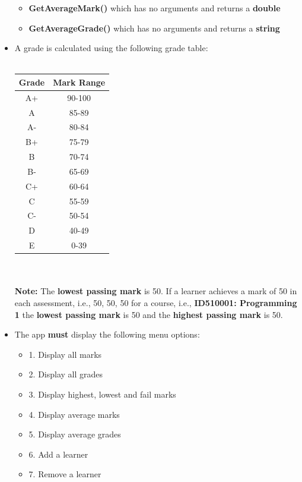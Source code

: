 \documentclass{article}
\begin{document}
\begin{itemize}
\begin{itemize}
        \item \textbf{GetAverageMark()} which has no arguments and returns a \textbf{double}
        \item \textbf{GetAverageGrade()} which has no arguments and returns a \textbf{string}
    \end{itemize}
    \item A grade is calculated using the following grade table:\\\\
    \renewcommand{\arraystretch}{1.5}
    \begin{tabular}{|c|c|}
        \hline
        \textbf{Grade} & \textbf{Mark Range} \\ \hline
        A+ & 90-100  \\ \hline
        A & 85-89  \\ \hline
        A- & 80-84 \\ \hline
        B+ & 75-79   \\ \hline
        B & 70-74  \\ \hline
        B- & 65-69  \\ \hline
        C+ & 60-64  \\ \hline
        C & 55-59 \\ \hline
        C- & 50-54  \\ \hline
        D & 40-49   \\ \hline
        E & 0-39   \\ \hline
    \end{tabular}
    \\\\ \textbf{Note:} The \textbf{lowest passing mark} is 50. If a learner achieves a mark of 50 in each assessment, i.e., 50, 50, 50 for a course, i.e., \textbf{ID510001: Programming 1} the \textbf{lowest passing mark} is 50 and the \textbf{highest passing mark} is 50.  
    \item The app \textbf{must} display the following menu options:
    \begin{itemize}
        \item 1. Display all marks
        \item 2. Display all grades
        \item 3. Display highest, lowest and fail marks
        \item 4. Display average marks
        \item 5. Display average grades
        \item 6. Add a learner
        \item 7. Remove a learner

\end{itemize}
\end{itemize}
\end{document}
